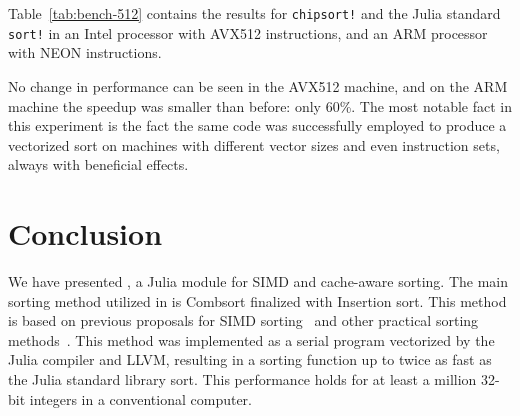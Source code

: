 \documentclass{juliacon}
\begin{document}
\begin{table}[h]
\label{tab:bench-cxx}
\end{table}

Table~\ref{tab:bench-512} contains the results for {\tt chipsort!} and the Julia standard {\tt sort!} in an Intel processor with AVX512 instructions, and an ARM processor with NEON instructions.
\begin{table}[h]
\label{tab:bench-512}
\end{table}

No change in performance can be seen in the AVX512 machine, and on the ARM machine the speedup was smaller than before: only 60\%. The most notable fact in this experiment is the fact the same code was successfully employed to produce a vectorized sort on machines with different vector sizes and even instruction sets, always with beneficial effects.

\section{Conclusion}
\label{sec:conclusion}
%
We have presented \chipsort, a Julia module for SIMD and cache-aware sorting. The main sorting method utilized in \chipsort is Combsort finalized with Insertion sort. This method is based on previous proposals for SIMD sorting~\cite{DBLP:conf/IEEEpact/InoueMKN07,DBLP:journals/pvldb/InoueT15} and other practical sorting methods~\cite{INCERPI198737,musser1997introspective}. This method was implemented as a serial program vectorized by the Julia compiler and LLVM, resulting in a sorting function up to twice as fast as the Julia standard library sort. This performance holds for at least a million 32-bit integers in a conventional computer.
\end{document}

